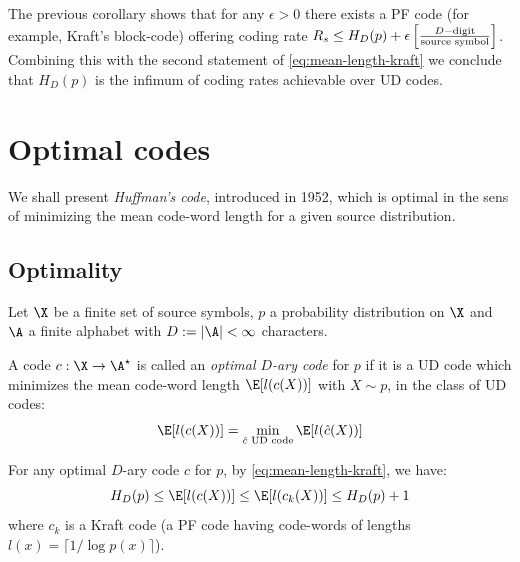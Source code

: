 \documentclass[toc, titlepaged]{../cs-classes/cs-classes}
\begin{document}
\begin{remark}
    The previous corollary shows that for any $\epsilon>0$ there exists a PF code (for example, Kraft's block-code) offering coding rate $R_s\leq H_D(p)+\epsilon \left[\frac{D-\textnormal{digit}}{\textnormal{source symbol}}\right]$. Combining this with the second statement of \eqref{eq:mean-length-kraft} we conclude that $H_D(p)$ is the infimum of coding rates achievable over UD codes.
\end{remark}

\section{Optimal codes}
We shall present \emph{Huffman's code}, introduced in 1952, which is optimal in the sens of minimizing the mean code-word length for a given source distribution.

\subsection{Optimality}
Let $\X$ be a finite set of source symbols, $p$ a probability distribution on $\X$ and $\A$ a finite alphabet with $D:=|\A|<\infty$ characters.

\begin{definition}
    A code $c:\X\to\A^\star$ is called an \emph{optimal $D$-ary code} for $p$ if it is a UD code which minimizes the mean code-word length $\E[l(c(X))]$ with $X\sim p$, in the class of UD codes:
    \begin{equation*}
        \E[l(c(X))] = \min_{\hat{c} \textnormal{ UD code}} \E[l(\hat{c}(X))]
    \end{equation*}
\end{definition}

\begin{remark}
    For any optimal $D$-ary code $c$ for $p$, by \ref{eq:mean-length-kraft}, we have:
    \begin{equation*}
        \label{eq:optimal-code-bound}
        H_D(p)\leq\E[l(c(X))]\leq\E[l(c_k(X))]\leq H_D(p) + 1
    \end{equation*}
    where $c_k$ is a Kraft code (a PF code having code-words of lengths $l(x)=\lceil1/\log p(x)\rceil$).
\end{remark}
\end{document}
